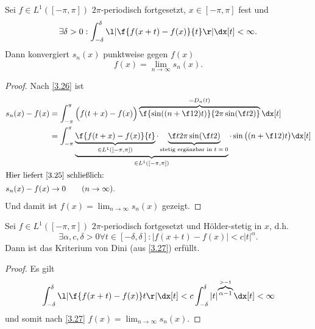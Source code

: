 \begin{st} \label{3.27}
	Sei $f \in L^1([-\pi,\pi])$ $2\pi$-periodisch fortgesetzt, $x \in [-\pi,\pi]$ fest und
	\[
		\exists \delta > 0 : \int_{-\delta}^{\delta} \l| \f{f(x+t)-f(x)}{t} \r| \dx[t] < \infty.
	\]
	Dann konvergiert $s_n(x)$ punktweise gegen $f(x)$
	\[
		f(x) = \lim_{n\to\infty} s_n(x).
	\]
	\begin{proof}
		Nach \ref{3.26} ist
		\begin{align*}
			s_n(x)-f(x)
			&= \int_{-\pi}^\pi \Big( f(t+x)-f(x) \Big) \overbrace{\f {\sin((n+\f 12) t)}{2\pi \sin(\f t2)}}^{=D_n(t)}  \dx[t] \\
			&= \int_{-\pi}^\pi \underbrace{\underbrace{\f {f(t+x)-f(x)}{t}}_{\in L^1([-\pi,\pi])} \cdot
		\underbrace{\f t{2\pi \sin(\f t2)}}_{\text{stetig ergänzbar in $t=0$}}}_{\in L^1([-\pi,\pi])} \cdot \sin\big((n+\f 12) t\big) \dx[t] \\
			\intertext{Hier liefert \ref{3.25} schließlich:}
			s_n(x)-f(x)&\to 0 \qquad (n\to \infty).
		\end{align*}
		Und damit ist $f(x)=\lim_{n\to \infty} s_n(x)$ gezeigt.
	\end{proof}
\end{st}

\begin{nt} \label{3.28}
	Sei $f \in L^1([-\pi,\pi])$ $2\pi$-periodisch fortgesetzt und Hölder-stetig in $x$, d.h.
	\[
		\exists \alpha, c, \delta > 0 \forall t \in [-\delta, \delta] : |f(x+t) - f(x)| < c |t|^\alpha.
	\]
	Dann ist das Kriterium von Dini (aus \ref{3.27}) erfüllt.
	\begin{proof}
		Es gilt
		\[
			\int_{-\delta}^{\delta} \l| \f{f(x+t) - f(x)}t \r| \dx[t]
			< c \int_{-\delta}^\delta |t|^{\overbrace{\scriptstyle\alpha - 1}^{\scriptscriptstyle >-1}} \dx[t]
			< \infty
		\]
		und somit nach \ref{3.27} $f(x) = \lim_{n\to\infty} s_n(x)$.
	\end{proof}
\end{nt}

